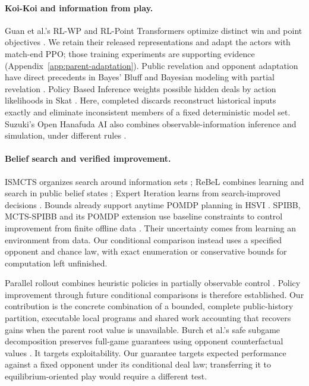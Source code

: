 \documentclass[11pt]{article}
\begin{document}
\paragraph{Koi-Koi and information from play.}
Guan et al.'s RL-WP and RL-Point Transformers optimize distinct win and point
objectives \cite{guan2023koikoi}. We retain their released representations and
adapt the actors with match-end PPO; those training experiments are supporting
evidence (Appendix~\ref{app:parent-adaptation}). Public revelation and opponent
adaptation have direct precedents in Bayes' Bluff and Bayesian modeling with
partial revelation \cite{southey2005bayes,ganzfried2024opponent}. Policy Based
Inference weights possible hidden deals by action likelihoods in Skat
\cite{rebstock2019policy}. Here, completed discards reconstruct historical inputs
exactly and eliminate inconsistent members of a fixed deterministic model set.
Suzuki's Open Hanafuda AI also combines observable-information inference and
simulation, under different rules \cite{suzuki2026openhanafuda}.

\paragraph{Belief search and verified improvement.}
ISMCTS organizes search around information sets \cite{cowling2012ismcts};
ReBeL combines learning and search in public belief states
\cite{brown2020rebel}; Expert Iteration learns from search-improved decisions
\cite{anthony2017expert}. Bounds already support anytime POMDP planning in
HSVI \cite{smith2004hsvi}. SPIBB, MCTS-SPIBB and its POMDP extension use
baseline constraints to control improvement from finite offline data
\cite{laroche2019spibb,castellini2023mcts,simao2023pomdpspi}. Their uncertainty
comes from learning an environment from data. Our conditional comparison
instead uses a specified opponent and chance law, with exact enumeration or
conservative bounds for computation left unfinished.

Parallel rollout combines heuristic policies in partially observable control
\cite{chang2004parallel}. Policy improvement through future conditional
comparisons is therefore established. Our contribution is the concrete
combination of a bounded, complete public-history partition, executable local
programs and shared work accounting that recovers gains when the parent root
value is unavailable. Burch et al.'s safe subgame decomposition preserves
full-game guarantees using opponent counterfactual values
\cite{burch2014decomposition}. It targets exploitability. Our guarantee targets
expected performance against a fixed opponent under its conditional deal law;
transferring it to equilibrium-oriented play would require a different test.
\end{document}
